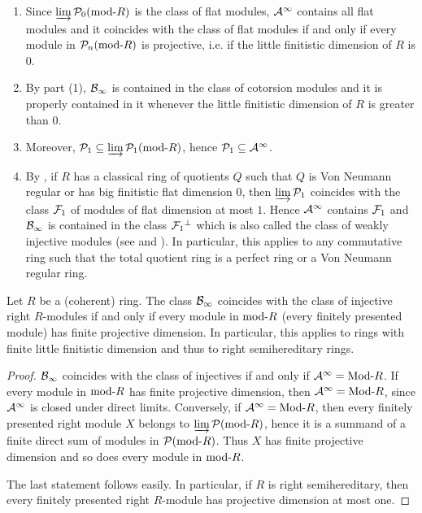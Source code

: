 \begin{rem}\label{R:sup-flat-if-cot} \begin{enumerate}\item Since $\varinjlim \mathcal{P}_0(\mathrm{mod}\textrm{-}{R})$ is the class of flat modules, $\mathcal{A}^{\infty}$ contains all flat modules and it coincides with the class of flat modules if and only if every module in $\mathcal{P}_n(\mathrm{mod}\textrm{-}{R})$ is projective, i.e. if the little finitistic dimension of $R$ is $0$.
\item By part (1), $\mathcal{B}_{\infty}$ is contained in the class of cotorsion modules and it is properly contained in it whenever the little finitistic dimension of $R$ is greater than $0$.
\item Moreover,  $\mathcal{P}_1\subseteq \varinjlim \mathcal{P}_1(\mathrm{mod}\textrm{-}{R})$, hence $\mathcal{P}_1\subseteq \mathcal{A}^{\infty}$.
\item By \cite[Theorem 6.7~(vi)]{BH09}, if $R$ has a classical ring of quotients $Q$ such that $Q$ is Von Neumann regular or has big finitistic flat dimension $0$, then $\varinjlim \mathcal{P}_1$ coincides with the class $\mathcal{F}_1$ of  modules of flat dimension at most $1$.
Hence $\mathcal{A}^{\infty}$ contains $\mathcal{F}_1$ and $ \mathcal{B}_{\infty}$ is contained in the class $\mathcal{F}_1{}^\perp{}$ which is also called the class of weakly injective modules (see \cite{FuLee1} and \cite{FuLee2}).
 In particular, this applies to any commutative ring such that the total quotient ring is a perfect ring or a Von Neumann regular ring.
\end{enumerate}
\end{rem}
%
  \begin{prop}\label{P:semihereditary} Let $R$ be a (coherent) ring. The class $\mathcal{B}_{\infty}$ coincides with the class of injective right  $R$-modules if and only if every module in $\mathrm{mod}\textrm{-}{R}$ (every finitely presented module) has finite projective dimension. In particular, this applies to rings with finite little finitistic dimension and thus to right semihereditary rings.
  \end{prop}

 \begin{proof}  $ \mathcal{B}_{\infty}$ coincides with the class of injectives if and only if $\mathcal{A}^{\infty}=\mathrm{Mod}\textrm{-}{R}$. If every module in $\mathrm{mod}\textrm{-}{R}$  has finite projective dimension, then $\mathcal{A}^{\infty}=\mathrm{Mod}\textrm{-}{R}$, since $\mathcal{A}^{\infty}$ is closed under direct limits. Conversely, if $\mathcal{A}^{\infty}=\mathrm{Mod}\textrm{-}{R}$, then every finitely presented right module $X$ belongs to $\varinjlim \mathcal{P}(\mathrm{mod}\textrm{-}{R})$, hence it is a summand of a finite direct sum of modules in $ \mathcal{P}(\mathrm{mod}\textrm{-}{R})$. Thus $X$ has finite projective dimension and so does every module in $ \mathrm{mod}\textrm{-}{R}$.

 The last statement follows easily. In particular,  if $R$ is right semihereditary, then every finitely presented right $R$-module has projective dimension at most one.\end{proof}


